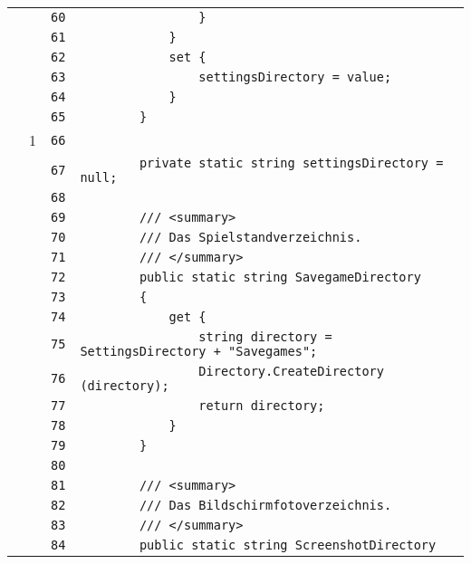 \documentclass[a4paper,10pt]{article}
\begin{document}
\begin{longtable}[l]{lrrl}
\cellcolor{gray} &  & \verb~60~ & \verb~                }~\\
\cellcolor{gray} &  & \verb~61~ & \verb~            }~\\
\cellcolor{gray} &  & \verb~62~ & \verb~            set {~\\
\cellcolor{gray} &  & \verb~63~ & \verb~                settingsDirectory = value;~\\
\cellcolor{gray} &  & \verb~64~ & \verb~            }~\\
\cellcolor{gray} &  & \verb~65~ & \verb~        }~\\
\cellcolor{green} & 1 & \verb~66~ & \verb~~\\
\cellcolor{gray} &  & \verb~67~ & \verb~        private static string settingsDirectory = null;~\\
\cellcolor{gray} &  & \verb~68~ & \verb~~\\
\cellcolor{gray} &  & \verb~69~ & \verb~        /// <summary>~\\
\cellcolor{gray} &  & \verb~70~ & \verb~        /// Das Spielstandverzeichnis.~\\
\cellcolor{gray} &  & \verb~71~ & \verb~        /// </summary>~\\
\cellcolor{gray} &  & \verb~72~ & \verb~        public static string SavegameDirectory~\\
\cellcolor{gray} &  & \verb~73~ & \verb~        {~\\
\cellcolor{gray} &  & \verb~74~ & \verb~            get {~\\
\cellcolor{gray} &  & \verb~75~ & \verb~                string directory = SettingsDirectory + "Savegames";~\\
\cellcolor{gray} &  & \verb~76~ & \verb~                Directory.CreateDirectory (directory);~\\
\cellcolor{gray} &  & \verb~77~ & \verb~                return directory;~\\
\cellcolor{gray} &  & \verb~78~ & \verb~            }~\\
\cellcolor{gray} &  & \verb~79~ & \verb~        }~\\
\cellcolor{gray} &  & \verb~80~ & \verb~~\\
\cellcolor{gray} &  & \verb~81~ & \verb~        /// <summary>~\\
\cellcolor{gray} &  & \verb~82~ & \verb~        /// Das Bildschirmfotoverzeichnis.~\\
\cellcolor{gray} &  & \verb~83~ & \verb~        /// </summary>~\\
\cellcolor{gray} &  & \verb~84~ & \verb~        public static string ScreenshotDirectory~\\

\end{longtable}
\end{document}
